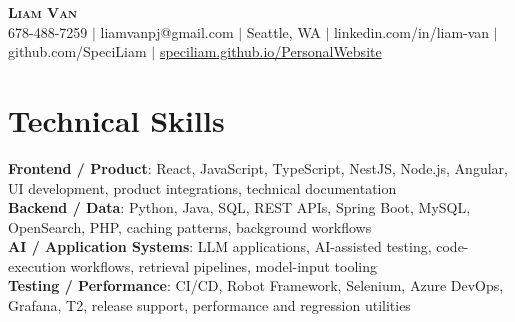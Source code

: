 \documentclass[letterpaper,11pt]{article}
\begin{document}

%
\begin{center}
    \textbf{\Huge \scshape Liam Van} \\ \vspace{1pt}
    \small 678-488-7259 $|$ \small {liamvanpj@gmail.com} $|$ Seattle, WA
 {{$|$ linkedin.com/in/liam-van} {$|$ github.com/SpeciLiam} {$|$ \href{https://speciliam.github.io/PersonalWebsite}{speciliam.github.io/PersonalWebsite}}}

\end{center}

\section{Technical Skills}
 \begin{itemize}[leftmargin=0.15in, label={}]
    \small{\item{
     \textbf{Frontend / Product}{: React, JavaScript, TypeScript, NestJS, Node.js, Angular, UI development, product integrations, technical documentation} \\
     \textbf{Backend / Data}{: Python, Java, SQL, REST APIs, Spring Boot, MySQL, OpenSearch, PHP, caching patterns, background workflows} \\
     \textbf{AI / Application Systems}{: LLM applications, AI-assisted testing, code-execution workflows, retrieval pipelines, model-input tooling} \\
     \textbf{Testing / Performance}{: CI/CD, Robot Framework, Selenium, Azure DevOps, Grafana, T2, release support, performance and regression utilities} \\
    }}
 \end{itemize}
%
\end{document}
